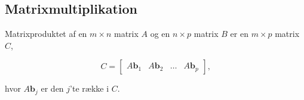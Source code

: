 \subsection{Matrixmultiplikation}


\begin{defn}{}{}
Matrixproduktet af en $m \times n$ matrix $A$ og en $n \times p$ matrix $B$ er en $m \times p$ matrix $C$, 

$$
C=
\begin{bmatrix}
A\textbf{b}_1 & A\textbf{b}_2 & \ldots & A\textbf{b}_p
\end{bmatrix}\text{,}
$$

hvor $A\textbf{b}_j$ er den $j$'te række i $C$.
\end{defn}

